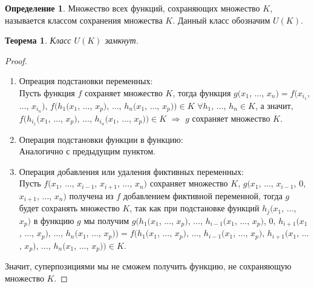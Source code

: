 \documentclass[a4paper, 12pt]{article}
\theoremstyle{definition}
\newtheorem*{definition}{Определение}
\theoremstyle{plain}
\newtheorem*{theorem}{Теорема}
\theoremstyle{remark}
\begin{document}
  \begin{definition}
    Множество всех функций, сохраняющих множество $K$, называется классом сохранения множества $K$. Данный класс обозначим $U(K)$.
  \end{definition}
  \begin{theorem}
    Класс $U(K)$ замкнут.
  \end{theorem}
  \begin{proof}
    \begin{enumerate}
      \item Опреация подстановки переменных:\\
      Пусть функция $f$ сохраняет множество $K$, тогда функция $g(x_1$, $\ldots$, $x_n)=f(x_{i_1}$, $\ldots$, $x_{i_n})$, $f(h_1(x_1$, $\ldots$, $x_p)$, $\ldots$, $h_n(x_1$, $\ldots$, $x_p))\in K$ $\forall h_1$, $\ldots$, $h_n\in K$, а значит, $f(h_{i_1}(x_1$, $\ldots$, $x_p)$, $\ldots$, $h_{i_n}(x_1$, $\ldots$, $x_p))\in K$ $\Longrightarrow$ $g$ сохраняет множество $K$.
      \item Операция подстановки функции в функцию:\\
      Аналогично с предыдущим пунктом.
      \item Операция добавления или удаления фиктивных переменных:\\
      Пусть $f(x_1$, $\ldots$, $x_{i-1}$, $x_{i+1}$, $\ldots$, $x_n)$ сохраняет множество $K$,  $g(x_1$, $\ldots$, $x_{i-1}$, $0$, $x_{i+1}$, $\ldots$, $x_n)$ получена из $f$ добавлением фиктивной переменной, тогда $g$ будет сохранять множество $K$, так как при подстановке функций $h_j(x_1$, $\ldots$, $x_p)$ в функцию $g$ мы получим $g(h_1(x_1$, $\ldots$, $x_p)$, $\ldots$, $h_{i-1}(x_1$, $\ldots$, $x_p)$, $0$, $h_{i+1}(x_1$, $\ldots$, $x_p)$, $\ldots$, $h_n(x_1$, $\ldots$, $x_p))=f(h_1(x_1$, $\ldots$, $x_p)$, $\ldots$, $h_{i-1}(x_1$, $\ldots$, $x_p)$, $h_{i+1}(x_1$, $\ldots$, $x_p)$, $\ldots$, $h_n(x_1$, $\ldots$, $x_p))\in K$.
    \end{enumerate}
    Значит, суперпозициями мы не сможем получить функцию, не сохраняющую множество $K$.
  \end{proof}
\end{document}
